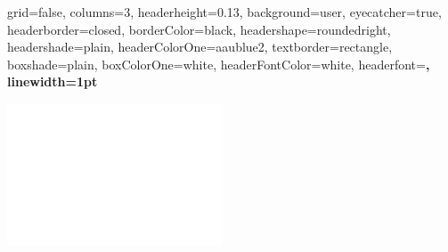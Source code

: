 \documentclass[paperwidth=90cm,paperheight=130cm,landscape,12pt]{preambles/baposter}
\begin{document}
\begin{poster}{
  grid=false,
  columns=3,
  headerheight=0.13\textheight,
  background=user,
  eyecatcher=true,
  headerborder=closed,
  borderColor=black,
  headershape=roundedright,
  headershade=plain,
  headerColorOne=aaublue2,
  textborder=rectangle,
  boxshade=plain,
  boxColorOne=white,
  headerFontColor=white,
  headerfont=\Large\sf\bf,
  linewidth=1pt
}
{

  \includegraphics[height=0.75\headerheight]{preambles/aau_logo_new_neg}
 
}
\end{poster}
\end{document}
